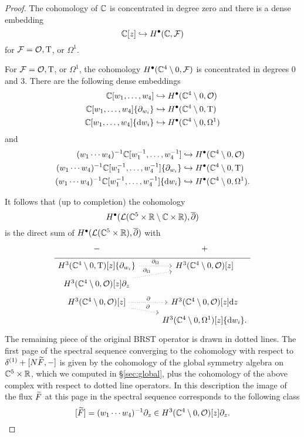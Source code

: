 \begin{proof}
The cohomology of $\mathbb C$ is concentrated in degree zero and there is a dense embedding
\[
\mathbb C[z] \hookrightarrow H^\bullet(\mathbb C, \mathcal F) 
\]
for $\mathcal F = \mathcal O, {\rm T}$, or $\Omega^1$. 

For $\mathcal F = \mathcal O, {\rm T}$, or $\Omega^1$, the cohomology $H^\bullet(\mathbb C^4 \setminus 0, \mathcal F)$ is concentrated in degrees $0$ and $3$. 
There are the following dense embeddings 
\begin{align*}
\mathbb C[w_1,\ldots, w_4] & \hookrightarrow H^\bullet(\mathbb C^4 \setminus 0, \mathcal O) \\ 
\mathbb C[w_1,\ldots, w_4] \{\partial_{w_i}\} & \hookrightarrow H^\bullet(\mathbb C^4 \setminus 0, {\rm T}) \\
\mathbb C[w_1,\ldots, w_4] \{{\rm d} w_i\} & \hookrightarrow H^\bullet(\mathbb C^4 \setminus 0, \Omega^1) 
\end{align*}
and
\begin{align*}
(w_1\cdots w_4)^{-1} \mathbb C[w_1^{-1},\ldots, w_4^{-1}] & \hookrightarrow H^\bullet(\mathbb C^4 \setminus 0, \mathcal O) \\ 
(w_1\cdots w_4)^{-1} \mathbb C[w_1^{-1},\ldots, w_4^{-1}] \{\partial_{w_i}\} & \hookrightarrow H^\bullet(\mathbb C^4 \setminus 0, {\rm T}) \\
(w_1\cdots w_4)^{-1} \mathbb C[w_1^{-1},\ldots, w_4^{-1}] \{{\rm d} w_i\} & \hookrightarrow H^\bullet(\mathbb C^4 \setminus 0, \Omega^1) .
\end{align*}

It follows that (up to completion) the cohomology 
\[
H^\bullet(\mathcal L(\mathbb C^5 \times \mathbb R \setminus \mathbb C \times \mathbb R) , \overline{\partial})
\]
is the direct sum of $H^\bullet(\mathcal L(\mathbb C^5 \times \mathbb R), \overline{\partial})$ with 
\begin{equation}
  \label{eqn:ads4ss2} 
  \begin{tikzcd}[row sep = 1 ex]
    - & + \\ \hline
H^3(\CC^4\setminus 0, \T)[z] \{\partial_{w_i}\}  \ar[r, dotted, "\div"] & H^3(\CC^4 \setminus 0, \cO) [z] \\
H^3(\CC^4\setminus 0, \cO) [z] \partial_z \ar[ur, dotted, "\div"] \\
H^3(\CC^4\setminus 0, \cO) [z] \ar[r, dotted, "\del"] \ar[dr, dotted, "\del"] & H^3(\CC^4\setminus 0, \cO)[z] \d z \\ & H^3(\CC^4\setminus 0, \Omega^1)[z] \{\d w_i\} .
\end{tikzcd}
\end{equation}
The remaining piece of the original BRST operator is drawn in dotted lines. 
The first page of the spectral sequence converging to the cohomology with respect to $\delta^{(1)} + [N\widetilde F, -]$ is given by the cohomology of the global symmetry algebra on $\mathbb C^5 \times \mathbb R$, which we computed in \S \ref{sec:global}, plus the cohomology of the above complex with respect to dotted line operators. 
In this description the image of the flux $\widetilde F$ at this page in the spectral sequence corresponds to the following class 
\[
[\widetilde F] = (w_1 \cdots w_4)^{-1} \partial_z \in H^3(\mathbb C^4\setminus 0, \mathcal O) [z] \partial_z .
\]


\end{proof}
